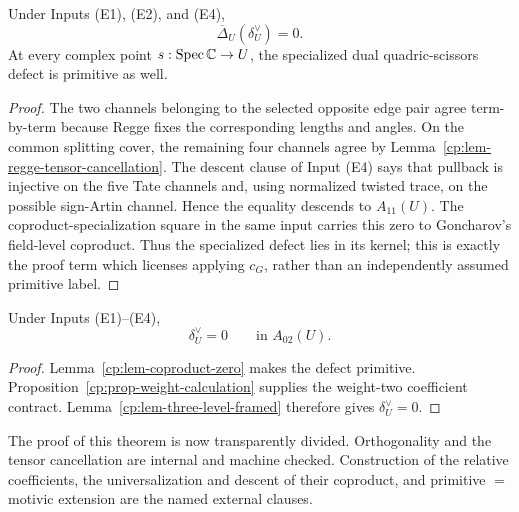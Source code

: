 \begin{lemma}
\label{cp:lem-coproduct-zero}
Under Inputs \textup{(E1), (E2), and (E4)},
\[
 \overline\Delta_U(\delta_U^\vee)=0.
\]
At every complex point \(s:\operatorname{Spec}\mathbb C\to U\), the specialized dual
quadric-scissors defect is primitive as well.
\end{lemma}

\begin{proof}
The two channels belonging to the selected opposite edge pair agree
term-by-term because Regge fixes the corresponding lengths and angles.  On
the common splitting cover, the remaining four channels agree by
Lemma~\ref{cp:lem-regge-tensor-cancellation}.  The descent clause of Input
\textup{(E4)} says that pullback is injective on the five Tate channels and,
using normalized twisted trace, on the possible sign-Artin channel.  Hence
the equality descends to \(A_{11}(U)\).  The coproduct-specialization square
in the same input carries this zero to Goncharov's field-level coproduct.
Thus the specialized defect lies in its kernel; this is exactly the proof
term which licenses applying \(c_G\), rather than an independently assumed
primitive label.
\end{proof}

\begin{theorem}
\label{cp:thm-relative-defect-zero}
Under Inputs \textup{(E1)--(E4)},
\[
 \delta_U^\vee=0\qquad\text{in }A_{02}(U).
\]
\end{theorem}

\begin{proof}
Lemma~\ref{cp:lem-coproduct-zero} makes the defect primitive.
Proposition~\ref{cp:prop-weight-calculation} supplies the weight-two
coefficient contract.  Lemma~\ref{cp:lem-three-level-framed} therefore
gives \(\delta_U^\vee=0\).
\end{proof}

The proof of this theorem is now transparently divided.  Orthogonality and
the tensor cancellation are internal and machine checked.  Construction of
the relative coefficients, the universalization and descent of their
coproduct, and primitive \(=\) motivic extension are the named external
clauses.
